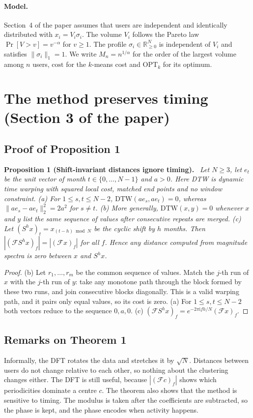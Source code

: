 \documentclass[11pt]{article}
\newcommand{\R}{\mathbb{R}}
\newcommand{\F}{\mathcal{F}}
\newcommand{\norm}[1]{\lVert #1 \rVert}
\newenvironment{result}[1]{\par\medskip\noindent\textbf{#1.}\ \itshape}{\par\smallskip}
\theoremstyle{remark}\newtheorem{remark}{Remark}\renewcommand{\theremark}{S\arabic{remark}}
\newcommand{\cost}{\mathrm{cost}}
\newcommand{\opt}{\mathrm{OPT}}
\begin{document}
\paragraph{Model.} Section~4 of the paper assumes that users are independent and identically distributed with $x_i=V_i\sigma_i$. The volume $V_i$ follows the Pareto law $\Pr[V>v]=v^{-\alpha}$ for $v\ge1$. The profile $\sigma_i\in\R^N_{\ge0}$ is independent of $V_i$ and satisfies $\norm{\sigma_i}_1=1$. We write $M_n=n^{1/\alpha}$ for the order of the largest volume among $n$ users, $\cost$ for the $k$-means cost and $\opt_k$ for its optimum.

\setcounter{section}{2}
\section{The method preserves timing (Section 3 of the paper)}\label{s:timing}

\subsection*{Proof of Proposition 1}
\begin{result}{Proposition 1 (Shift-invariant distances ignore timing)}
Let $N\ge3$, let $e_t$ be the unit vector of month $t\in\{0,\dots,N-1\}$ and $a>0$. Here DTW is dynamic time warping with squared local cost, matched end points and no window constraint.
(a) For $1\le s,t\le N-2$, $\mathrm{DTW}(ae_s,ae_t)=0$, whereas $\norm{ae_s-ae_t}_2^2=2a^2$ for $s\ne t$.
(b) More generally, $\mathrm{DTW}(x,y)=0$ whenever $x$ and $y$ list the same sequence of values after consecutive repeats are merged.
(c) Let $(S^hx)_t=x_{(t-h)\bmod N}$ be the cyclic shift by $h$ months. Then $|(\F S^hx)_f|=|(\F x)_f|$ for all $f$. Hence any distance computed from magnitude spectra is zero between $x$ and $S^hx$.
\end{result}
\begin{proof}
(b) Let $r_1,\dots,r_m$ be the common sequence of values. Match the $j$-th run of $x$ with the $j$-th run of $y$: take any monotone path through the block formed by these two runs, and join consecutive blocks diagonally. This is a valid warping path, and it pairs only equal values, so its cost is zero. (a) For $1\le s,t\le N-2$ both vectors reduce to the sequence $0,a,0$. (c) $(\F S^hx)_f=e^{-2\pi\mathrm{i}fh/N}(\F x)_f$.
\end{proof}

\subsection*{Remarks on Theorem 1}
Informally, the DFT rotates the data and stretches it by $\sqrt N$. Distances between users do not change relative to each other, so nothing about the clustering changes either. The DFT is still useful, because $|(\F c)_f|$ shows which periodicities dominate a centre $c$. The theorem also shows that the method is sensitive to timing. The modulus is taken after the coefficients are subtracted, so the phase is kept, and the phase encodes when activity happens.
\end{document}

